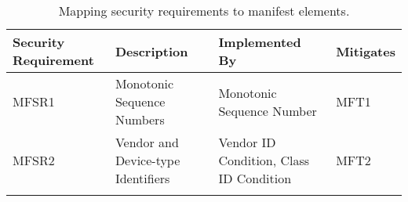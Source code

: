 \documentclass[0-thesis.tex]{subfiles}
\begin{document}
\begin{longtable}[]{@{}llll@{}}
    \caption{Mapping security requirements to manifest elements.}
    \label{tab:requirements-to-elements}\\
    \toprule
    \begin{minipage}[b]{0.16\columnwidth}\raggedright\strut
    Security Requirement\strut
    \end{minipage} & \begin{minipage}[b]{0.29\columnwidth}\raggedright\strut
    Description\strut
    \end{minipage} & \begin{minipage}[b]{0.34\columnwidth}\raggedright\strut
    Implemented By\strut
    \end{minipage} & \begin{minipage}[b]{0.10\columnwidth}\raggedright\strut
    Mitigates\strut
    \end{minipage}\tabularnewline
    \midrule
    \endhead
    \begin{minipage}[t]{0.16\columnwidth}\raggedright\strut
    MFSR1\strut
    \end{minipage} & \begin{minipage}[t]{0.29\columnwidth}\raggedright\strut
    Monotonic Sequence Numbers\strut
    \end{minipage} & \begin{minipage}[t]{0.34\columnwidth}\raggedright\strut
    Monotonic Sequence Number\strut
    \end{minipage} & \begin{minipage}[t]{0.10\columnwidth}\raggedright\strut
    MFT1\strut
    \end{minipage}\tabularnewline
    \begin{minipage}[t]{0.16\columnwidth}\raggedright\strut
    MFSR2\strut
    \end{minipage} & \begin{minipage}[t]{0.29\columnwidth}\raggedright\strut
    Vendor and Device-type Identifiers\strut
    \end{minipage} & \begin{minipage}[t]{0.34\columnwidth}\raggedright\strut
    Vendor ID Condition, Class ID Condition\strut
    \end{minipage} & \begin{minipage}[t]{0.10\columnwidth}\raggedright\strut
    MFT2\strut
    \end{minipage}\tabularnewline
    \begin{minipage}[t]{0.16\columnwidth}\raggedright\strut

\end{minipage}
\end{longtable}
\end{document}
